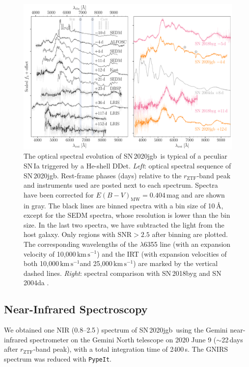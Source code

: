 \documentclass[twocolumn]{aastex631}
\newcommand{\sn}{SN\,2020jgb}
\newcommand{\kms}{$\mathrm{km}\,\mathrm{s}^{-1}$}
\begin{document}

\begin{figure}
    \centering
    \includegraphics[width=\textwidth]{optical_spec_evolution.pdf}
    \caption{The optical spectral evolution of \sn\ is typical of a peculiar SN\,Ia triggered by a He-shell DDet. \textit{Left}: optical spectral sequence of \sn. Rest-frame phases (days) relative to the $r_\mathrm{ZTF}$-band peak and instruments used are posted next to each spectrum. Spectra have been corrected for $E(B-V)_\mathrm{MW} = 0.404$\,mag and are shown in gray. The black lines are binned spectra with a bin size of 10\,\AA, except for the SEDM spectra, whose resolution is lower than the bin size. In the last two spectra, we have subtracted the light from the host galaxy. Only regions with $\mathrm{SNR}>2.5$ after binning are plotted. The corresponding wavelengths of the  $\lambda$6355 line (with an expansion velocity of 10,000\,\kms) and the  IRT (with expansion velocities of both 10,000\,\kms and 25,000\,\kms) are marked by the vertical dashed lines.
    \textit{Right}: spectral comparison with SN\,2018byg \citep[subluminous He-shell DDet;][]{de_18byg_2019} and SN\,2004da \citep[normal luminosity;][]{Silverman_2012}.}
    \label{fig:spec_evo}
\end{figure}

\subsection{Near-Infrared Spectroscopy}
We obtained one NIR (0.8--2.5\,\micron) spectrum of \sn\ using the Gemini near-infrared spectrometer \citep[GNIRS;][]{GNIRS1998} on the Gemini North telescope on 2020 June 9 ($\sim$22\,days after $r_\mathrm{ZTF}$-band peak), with a total integration time of 2400\,s. The GNIRS spectrum was reduced with \texttt{PypeIt}.
\end{document}
